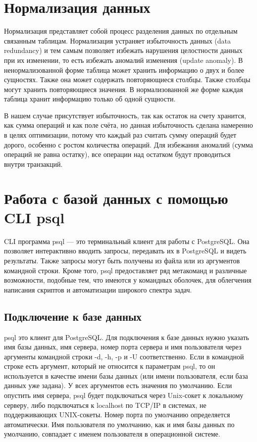 \documentclass[14pt]{extarticle}
\begin{document}
    \newpage
    \section{Нормализация данных}
    Нормализация представляет собой процесс разделения данных по отдельным связанным таблицам. Нормализация устраняет избыточность данных (data redundancy) и тем самым позволяет избежать нарушения целостности данных при их изменении, то есть избежать аномалий изменения (update anomaly).
    В ненормализованной форме таблица может хранить информацию о двух и более сущностях. Также она может содержать повторяющиеся столбцы. Также столбцы могут хранить повторяющиеся значения. В нормализованной же форме каждая таблица хранит информацию только об одной сущности.

    В нашем случае присутствует избыточность, так как остаток на счету хранится, как сумма операций и как поле счёта, но данная избыточность сделана намеренно в целях оптимизации, потому что каждый раз считать сумму операций будет дорого, особенно с ростом количества операций. Для избежания аномалий (сумма операций не равна остатку), все операции над остатком будут проводиться внутри транзакций.

    \newpage
    \section{Работа с базой данных с помощью CLI psql}

    CLI программа psql --- это терминальный клиент для работы с PostgreSQL. Она позволяет интерактивно вводить запросы, передавать их в PostgreSQL и видеть результаты. Также запросы могут быть получены из файла или из аргументов командной строки. Кроме того, psql предоставляет ряд метакоманд и различные возможности, подобные тем, что имеются у командных оболочек, для облегчения написания скриптов и автоматизации широкого спектра задач.

    \newpage
    \subsection{Подключение к базе данных}

    psql это клиент для PostgreSQL. Для подключения к базе данных нужно указать имя базы данных, имя сервера, номер порта сервера и имя пользователя через аргументы командной строки -d, -h, -p и -U соответственно. Если в командной строке есть аргумент, который не относится к параметрам psql, то он используется в качестве имени базы данных (или имени пользователя, если база данных уже задана). У всех аргументов есть значения по умолчанию. Если опустить имя сервера, psql будет подключаться через Unix-сокет к локальному серверу, либо подключаться к localhost по TCP/IP в системах, не поддерживающих UNIX-сокеты. Номер порта по умолчанию определяется автоматически. Имя пользователя по умолчанию, как и имя базы данных по умолчанию, совпадает с именем пользователя в операционной системе.
\end{document}
